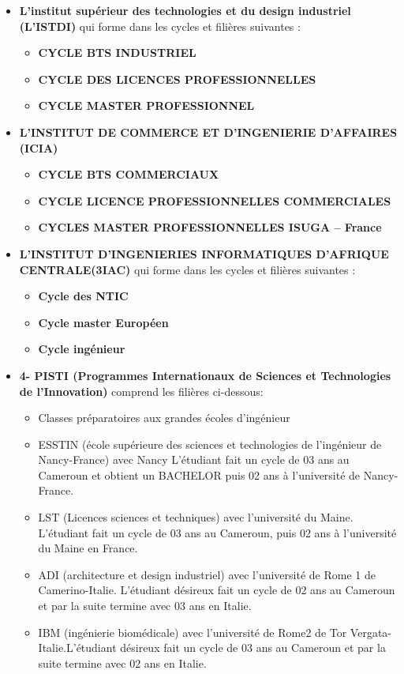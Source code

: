 	\begin{itemize}
        \item \textbf{L’institut supérieur des technologies et du design industriel (L’ISTDI)} qui forme dans les cycles et filières suivantes :
        \begin{itemize}
            \item \textbf{CYCLE BTS INDUSTRIEL}
            \item \textbf{CYCLE DES LICENCES PROFESSIONNELLES}
            \item \textbf{CYCLE MASTER PROFESSIONNEL}
        \end{itemize}
        \item \textbf{L’INSTITUT DE COMMERCE ET D’INGENIERIE D’AFFAIRES (ICIA)}
        \begin{itemize}
            \item \textbf{CYCLE BTS COMMERCIAUX}
            \item \textbf{CYCLE LICENCE PROFESSIONNELLES COMMERCIALES}
            \item \textbf{CYCLES MASTER PROFESSIONNELLES ISUGA – France}
        \end{itemize}
        \item \textbf{L’INSTITUT D’INGENIERIES INFORMATIQUES D’AFRIQUE CENTRALE(3IAC)} qui forme dans les cycles et filières suivantes :
        \begin{itemize}
            \item \textbf{Cycle des NTIC}
            \item \textbf{Cycle master Européen}
            \item \textbf{Cycle ingénieur}
        \end{itemize}
        \item \textbf{4- PISTI (Programmes Internationaux de Sciences et Technologies de l’Innovation)} comprend les filières ci-dessous:
        \begin{itemize}
            \item Classes préparatoires aux grandes écoles d’ingénieur
            \item ESSTIN (école supérieure des sciences et technologies de l’ingénieur de Nancy-France) avec Nancy L’étudiant fait un cycle de 03 ans au Cameroun et obtient un BACHELOR puis 02 ans à l’université de Nancy-France.
            \item LST (Licences sciences et techniques) avec l’université du Maine. L’étudiant fait un cycle de 03 ans au Cameroun, puis 02 ans à l’université du Maine en France.
            \item ADI (architecture et design industriel) avec l’université de Rome 1 de Camerino-Italie. L’étudiant désireux fait un cycle de 02 ans au Cameroun et par la suite termine avec 03 ans en Italie.
            \item IBM (ingénierie biomédicale) avec l’université de Rome2 de Tor Vergata-Italie.L’étudiant désireux fait un cycle de 03 ans au Cameroun et par la suite termine avec 02 ans en Italie.
        \end{itemize}
    \end{itemize}
	
